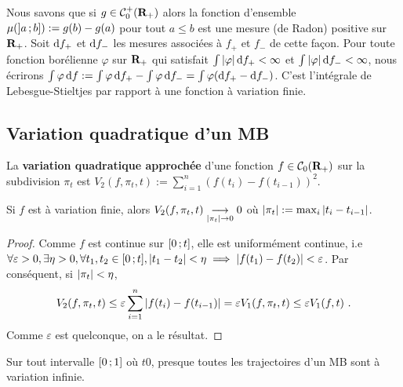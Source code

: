 	Nous savons que si $g \in \mathcal{C}_0^+(\mathbf{R}_+)$ alors la fonction d'ensemble $\mu(\mathopen{}\mathclose{\left]a\mathclose{}\mathpunct{};b\right]}) := g(b) - g(a)$ pour tout $a \leq b$ est une mesure (de Radon) positive sur $\mathbf{R}_+$.
	Soit $\mathop{}\mathopen{}\mathrm{d} f_+$ et $\mathop{}\mathopen{}\mathrm{d} f_-$ les mesures associées à $f_+$ et $f_-$ de cette façon.
	Pour toute fonction borélienne $\varphi$ sur $\mathbf{R}_+$ qui satisfait $\int \left\lvert\varphi\right\rvert \mathop{}\mathopen{}\mathrm{d} f_+ < \infty$ et $\int \left\lvert\varphi\right\rvert \mathop{}\mathopen{}\mathrm{d} f_- < \infty$, nous écrirons $\int \varphi \mathop{}\mathopen{}\mathrm{d} f := \int \varphi \mathop{}\mathopen{}\mathrm{d} f_+ - \int \varphi \mathop{}\mathopen{}\mathrm{d} f_- = \int \varphi (\mathop{}\mathopen{}\mathrm{d} f_+ - \mathop{}\mathopen{}\mathrm{d} f_-)$.
	C'est l'intégrale de Lebesgue-Stieltjes par rapport à une fonction à variation finie.


\subsection{Variation quadratique d'un MB}

	\begin{defn}
		La \textbf{variation quadratique approchée} d'une fonction $f \in \mathcal{C}_0(\mathbf{R}_+)$ sur la subdivision $\pi_t$ est $V_2(f,\pi_t,t) := \sum_{i = 1}^n (f(t_i) - f(t_{i-1}))^2$.
	\end{defn}
	
	\begin{pop}
		Si $f$ est à variation finie, alors $V_2(f,\pi_t,t) \underset{\left\lvert\pi_t\right\rvert \to 0}{\longrightarrow} 0$ où $\left\lvert\pi_t\right\rvert := \max_i \left\lvert t_i - t_{i-1}\right\rvert$.
	\end{pop}
	
	\begin{proof}
		Comme $f$ est continue sur $\mathopen{}\mathclose{\left[0\mathclose{}\mathpunct{};t\right]}$, elle est uniformément continue, i.e $\forall \varepsilon > 0, \exists \eta > 0, \forall t_1,t_2 \in \mathopen{}\mathclose{\left[0\mathclose{}\mathpunct{};t\right]}, \left\lvert t_1 - t_2\right\rvert < \eta \implies \left\lvert f(t_1) - f(t_2)\right\rvert < \varepsilon$.
		Par conséquent, si $\left\lvert\pi_t\right\rvert < \eta$,
		$$V_2(f,\pi_t,t) \leq \varepsilon \sum_{i = 1}^n \left\lvert f(t_i) - f(t_{i-1})\right\rvert = \varepsilon V_1(f,\pi_t,t) \leq \varepsilon V_1(f,t)\ .$$
		Comme $\varepsilon$ est quelconque, on a le résultat.
	\end{proof}
	
	\begin{thm}
		Sur tout intervalle $\mathopen{}\mathclose{\left[0\mathclose{}\mathpunct{};1\right]}$ où $t  0$, presque toutes les trajectoires d'un MB sont à variation infinie.
	\end{thm}
	
